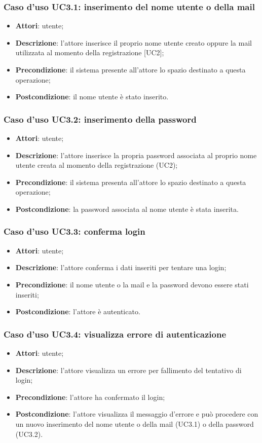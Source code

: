 \subsubsection{Caso d'uso UC3.1: inserimento del nome utente o della mail}
\begin{itemize}
	\item \textbf{Attori}: utente;
	\item \textbf{Descrizione}: l'attore inserisce il proprio nome utente creato oppure la mail utilizzata al momento della registrazione [UC2];
	\item \textbf{Precondizione}: il sistema presente all'attore lo spazio destinato a questa operazione;
	\item \textbf{Postcondizione}: il nome utente è stato inserito.
\end{itemize}
\subsubsection{Caso d'uso UC3.2: inserimento della password}
\begin{itemize}
	\item \textbf{Attori}: utente;
	\item \textbf{Descrizione}: l'attore inserisce la propria password associata al proprio nome utente creata al momento della registrazione (UC2);
	\item \textbf{Precondizione}: il sistema presenta all'attore lo spazio destinato a questa operazione;
	\item \textbf{Postcondizione}: la password associata al nome utente è stata inserita.
\end{itemize}
\subsubsection{Caso d'uso UC3.3: conferma login}
\begin{itemize}
	\item \textbf{Attori}: utente;
	\item \textbf{Descrizione}: l'attore conferma i dati inseriti per tentare una login;
	\item \textbf{Precondizione}: il nome utente o la mail e la password devono essere stati inseriti;
	\item \textbf{Postcondizione}: l'attore è autenticato.
\end{itemize}
\subsubsection{Caso d'uso UC3.4: visualizza errore di autenticazione}
\begin{itemize}
	\item \textbf{Attori}: utente;
	\item \textbf{Descrizione}: l'attore visualizza un errore per fallimento del tentativo di login;
	\item \textbf{Precondizione}: l'attore ha confermato il login;
	\item \textbf{Postcondizione}: l'attore visualizza il messaggio d'errore e può procedere con un nuovo inserimento del nome utente o della mail (UC3.1) o della password (UC3.2).
\end{itemize}
